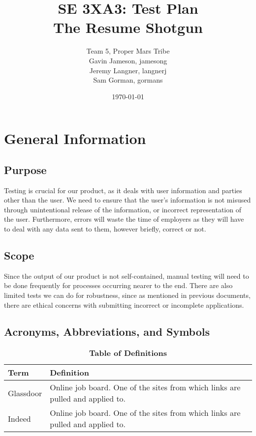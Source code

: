 \documentclass[12pt, titlepage]{article}
\title{SE 3XA3: Test Plan\\The Resume Shotgun}
\author{Team 5, Proper Mars Tribe
		\\ Gavin Jameson, jamesong
		\\ Jeremy Langner, langnerj
		\\ Sam Gorman, gormans
}
\date{\today}
\begin{document}
\maketitle

\tableofcontents
\listoftables
\listoffigures

\newpage


\section{General Information}

\subsection{Purpose}

Testing is crucial for our product, as it deals with user information and parties other than the user. We need to ensure that the user's information is not misused through unintentional release of the information, or incorrect representation of the user. Furthermore, errors will waste the time of employers as they will have to deal with any data sent to them, however briefly, correct or not.

\subsection{Scope}

Since the output of our product is not self-contained, manual testing will need to be done frequently for processes occurring nearer to the end. There are also limited tests we can do for robustness, since as mentioned in previous documents, there are ethical concerns with submitting incorrect or incomplete applications.

\subsection{Acronyms, Abbreviations, and Symbols}

\begin{table}[!htbp]
\caption{\textbf{Table of Definitions}} \label{Table}

\begin{tabularx}{\textwidth}{p{3cm}X}
\toprule
\textbf{Term} & \textbf{Definition}\\
\midrule
Glassdoor & Online job board. One of the sites from which links are pulled and applied to.\\
Indeed & Online job board. One of the sites from which links are pulled and applied to.\\
\bottomrule
\end{tabularx}

\end{table}	
\end{document}
